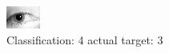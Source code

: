 \begin{figure}[h!]
\begin{center}
\includegraphics[width=0.60\columnwidth]{figures/ID1278_class_4_target_3.png}
\end{center}
\caption{ Classification: 4 actual target: 3}
\label{fig:ID1278_class_4_target_3}
\end{figure}
